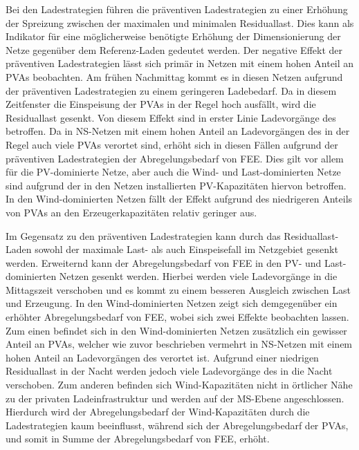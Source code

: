 Bei den Ladestrategien führen die präventiven Ladestrategien zu einer Erhöhung der Spreizung zwischen der maximalen und minimalen Residuallast.
Dies kann als Indikator für eine möglicherweise benötigte Erhöhung der Dimensionierung der Netze gegenüber dem Referenz-Laden gedeutet werden.
Der negative Effekt der präventiven Ladestrategien lässt sich primär in Netzen mit einem hohen Anteil an \glspl{PVA} beobachten.
Am frühen Nachmittag kommt es in diesen Netzen aufgrund der präventiven Ladestrategien zu einem geringeren Ladebedarf.
Da in diesem Zeitfenster die Einspeisung der \glspl{PVA} in der Regel hoch ausfällt, wird die Residuallast gesenkt.
Von diesem Effekt sind in erster Linie Ladevorgänge des \UC \zH betroffen.
Da in \gls{NS}-Netzen mit einem hohen Anteil an Ladevorgängen des \UC \zH in der Regel auch viele \glspl{PVA} verortet sind, erhöht sich in diesen Fällen aufgrund der präventiven Ladestrategien der Abregelungsbedarf von \gls{FEE}.
Dies gilt vor allem für die \gls{PV}-dominierte Netze, aber auch die Wind- und Last-dominierten Netze sind aufgrund der in den Netzen installierten \gls{PV}-Kapazitäten hiervon betroffen.
In den Wind-dominierten Netzen fällt der Effekt aufgrund des niedrigeren Anteils von \glspl{PVA} an den Erzeugerkapazitäten relativ geringer aus.\medskip

Im Gegensatz zu den präventiven Ladestrategien kann durch das Residuallast-Laden sowohl der maximale Last- als auch Einspeisefall im Netzgebiet gesenkt werden.
Erweiternd kann der Abregelungsbedarf von \gls{FEE} in den \gls{PV}- und Last-dominierten Netzen gesenkt werden.
Hierbei werden viele Ladevorgänge in die Mittagszeit verschoben und es kommt zu einem besseren Ausgleich zwischen Last und Erzeugung.
In den Wind-dominierten Netzen zeigt sich demgegenüber ein erhöhter Abregelungsbedarf von \gls{FEE}, wobei sich zwei Effekte beobachten lassen.
Zum einen befindet sich in den Wind-dominierten Netzen zusätzlich ein gewisser Anteil an \glspl{PVA}, welcher wie zuvor beschrieben vermehrt in \gls{NS}-Netzen mit einem hohen Anteil an Ladevorgängen des \UC \zH verortet ist.
Aufgrund einer niedrigen Residuallast in der Nacht werden jedoch viele Ladevorgänge des \UC \zH in die Nacht verschoben.
Zum anderen befinden sich Wind-Kapazitäten nicht in örtlicher Nähe zu der privaten Ladeinfrastruktur und werden auf der \gls{MS}-Ebene angeschlossen.
Hierdurch wird der Abregelungsbedarf der Wind-Kapazitäten durch die Ladestrategien kaum beeinflusst, während sich der Abregelungsbedarf der \glspl{PVA}, und somit in Summe der Abregelungsbedarf von \gls{FEE}, erhöht.\medskip

